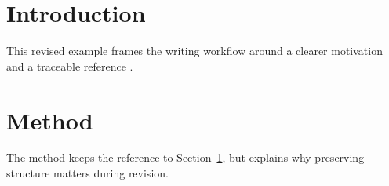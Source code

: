 \documentclass{article}
\begin{document}
\section{Introduction}
\label{sec:intro}
This revised example frames the writing workflow around a clearer motivation and a traceable reference \cite{smith2024example}.

\section{Method}
The method keeps the reference to Section~\ref{sec:intro}, but explains why preserving structure matters during revision.
\end{document}
